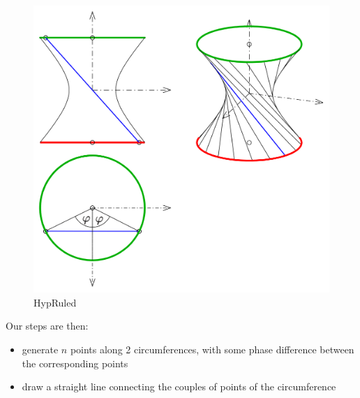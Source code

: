 \documentclass[11pt]{article}
\providecommand{\tightlist}{%
      \setlength{\itemsep}{0pt}\setlength{\parskip}{0pt}}
\begin{document}
\begin{figure}
\centering
\includegraphics{./HyperboloidRuled.png}
\caption{HypRuled}
\end{figure}

Our steps are then:

\begin{itemize}
\tightlist
\item
  generate \(n\) points along 2 circumferences, with some phase
  difference between the corresponding points
\item
  draw a straight line connecting the couples of points of the
  circumference
\end{itemize}
\end{document}
